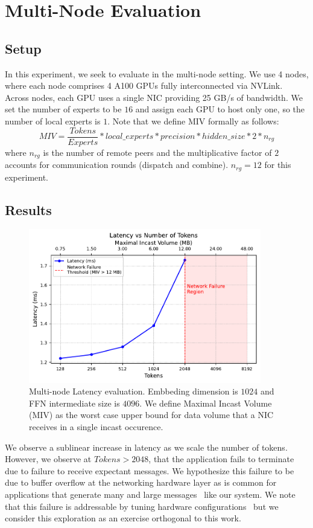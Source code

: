 \section{Multi-Node Evaluation}\label{sec:multi-node-evaluation}
\subsection{Setup}\label{subsec:setup}
In this experiment, we seek to evaluate \sysname in the multi-node setting.
We use 4 nodes, where each node comprises 4 A100 GPUs fully interconnected via NVLink.
Across nodes, each GPU uses a single NIC providing 25 GB/s of bandwidth.
We set the number of experts to be $16$ and assign each GPU to host only one,
so the number of local experts is $1$.
Note that we define MIV formally as follows:
\[
    MIV = \frac{Tokens}{Experts} * local\_{experts} * precision * hidden\_size * 2 * n_{rg}
\]
where $n_{rg}$ is the number of remote peers and the multiplicative
factor of $2$ accounts for communication rounds (dispatch and combine).
$n_{rg} = 12$ for this experiment.
\subsection{Results}\label{subsec:results}
\begin{figure} [!ht]
    \centering
    \includegraphics[width=4in,keepaspectratio]{figures/multi_node_fail}
    \caption{Multi-node Latency evaluation.
    Embbeding dimension is $1024$ and FFN intermediate size is $4096$.
    We define Maximal Incast Volume (MIV) as the worst case upper bound for data volume that a
    NIC receives in a single incast occurence.}
    \label{fig:multi_fail}
\end{figure}
We observe a sublinear increase in latency as we scale the number of tokens.
However, we observe at $Tokens > 2048$, that the application fails to terminate
due to failure to receive expectant messages.
We hypothesize this failure to be due to buffer overflow at the networking hardware layer as is common for applications
that generate many and large messages~\cite{nerscNetworkNERSC} like our system.
We note that this failure is addressable by tuning hardware configurations~\cite{ofiwgFi_cxi7} but we consider
this exploration as an exercise orthogonal to this work.
